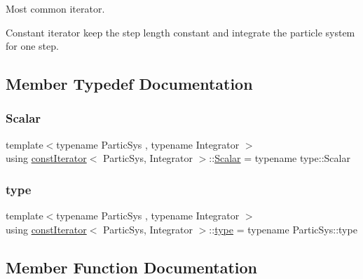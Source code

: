 Most common iterator. 

Constant iterator keep the step length constant and integrate the particle system for one step. 

\subsection{Member Typedef Documentation}
\mbox{\label{classconst_iterator_a524fa9110f25e60075d8ec02e5f5bb71}} 
\subsubsection{\texorpdfstring{Scalar}{Scalar}}
{\footnotesize\ttfamily template$<$typename Partic\+Sys , typename Integrator $>$ \\
using \mbox{\hyperlink{classconst_iterator}{const\+Iterator}}$<$ Partic\+Sys, Integrator $>$\+::\mbox{\hyperlink{classconst_iterator_a524fa9110f25e60075d8ec02e5f5bb71}{Scalar}} =  typename type\+::\+Scalar}

\mbox{\label{classconst_iterator_aa4809910ddae08b6ffd78046ee05061e}} 
\subsubsection{\texorpdfstring{type}{type}}
{\footnotesize\ttfamily template$<$typename Partic\+Sys , typename Integrator $>$ \\
using \mbox{\hyperlink{classconst_iterator}{const\+Iterator}}$<$ Partic\+Sys, Integrator $>$\+::\mbox{\hyperlink{classconst_iterator_aa4809910ddae08b6ffd78046ee05061e}{type}} =  typename Partic\+Sys\+::type}



\subsection{Member Function Documentation}
\mbox{\label{classconst_iterator_af7cdfe1f6ab00dab9942645d5306ea32}} 
